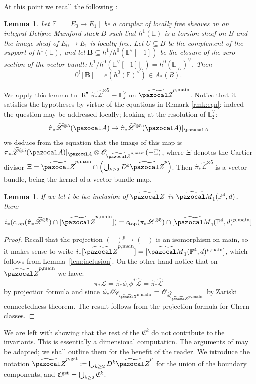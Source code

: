 \documentclass[11pt]{amsart}
\newcommand{\PP}{\mathbb P}
\newcommand{\OO}{\mathcal O}
\renewcommand{\to}{\rightarrow}
\newcommand{\A}{\pazocal A}
\newcommand{\hL}{\widehat{\mathcal L}}
\newcommand{\cC}{\mathcal C}
\newcommand{\hC}{\widehat{\mathcal C}}
\newcommand{\tZ}{\widetilde{\pazocal Z}}
\newcommand{\tZp}{\widetilde{\pazocal Z}^p}
\newcommand{\tM}{\widetilde{\pazocal M}}
\newcommand{\R}{\operatorname{R}}
\theoremstyle{plain}
\newtheorem{lem}[thm]{Lemma}
\theoremstyle{definition}
\begin{document}
At this point we recall the following \cite[Lemma 5.3]{CLpfields}:
\begin{lem}
Let $\mathbb E=[E_0\to E_1]$ be a complex of locally free sheaves on an integral Deligne-Mumford stack $B$ such that
$h^1(\mathbb E)$ is a torsion sheaf on $B$ and the image sheaf of $E_0\to E_1$ is locally free.
Let $U\subseteq B$ be the complement of the support of $h^1(\mathbb E)$, and let $\mathbf{B}\subseteq h^1/h^0(\mathbb E^\vee[-1])$
be the closure of the zero section  of the vector bundle $h^1/h^0(\mathbb E^\vee[-1]|_U)= h^0(\mathbb E|_U)^\vee$. Then
$$0^![\mathbf{B}]=e(h^0(\mathbb E)^\vee)\in A_*(B).
$$
\end{lem}

We apply this lemma to $\R^{\bullet}\hat{\pi}_*\hL^{\otimes 5}=\mathbb E_2^\vee$ on $\tZ^{p,\rm{main}}$. Notice that it satisfies the hypotheses by virtue of the equations in Remark \ref{rmk:eqn}: indeed the question may be addressed locally; looking at the resolution of $\mathbb E_2^\vee$:
\[
 \hat\pi_*\hL^{\otimes 5}(\A)\to \hat\pi_*\hL^{\otimes 5}(\A)\rvert_{\A}
\]
we deduce from the equation that the image of this map is $\pi_*\hL^{\otimes 5}(\A)\rvert_{\A}\otimes\OO_{\tZ^{p,\rm{main}}}(-\Xi)$, where $\Xi$ denotes the Cartier divisor $\Xi=\tZ^{p,\rm{main}}\cap\left(\bigcup_{k\geq 2}D^k\tZp\right)$. Then $\hat\pi_*\hL^{\otimes 5}$ is a vector bundle, being the kernel of a vector bundle map.

\begin{lem}\label{lem:main-compo}
 If we let $i$ be the inclusion of $\tZ$ in $\tM_1(\PP^4,d)$, then:
 \[
  i_*(c_{\rm{top}}(\hat{\pi}_*\hL^{\otimes 5})\cap[\tZ^{p,\rm{main}}])=c_{\rm{top}}({\pi}_*\mathcal L^{\otimes 5})\cap[\tM_1(\PP^4,d)^{p,\rm{main}}]
 \]
\end{lem}
\begin{proof}
 Recall that the projection $(-)^p\to (-)$ is an isomorphism on main, so it makes sense to write $i_*[\tZ^{p,\rm{main}}]=[\tM_1(\PP^4,d)^{p,\rm{main}}]$, which follows from Lemma~\ref{lem:inclusion}. On the other hand notice that on $\tZ^{p,\rm{main}}$ we have:
 \[
  \pi_*\mathcal L=\hat{\pi}_*\phi_*\phi^*\hL=\hat{\pi}_*\hL
 \]
by projection formula and since $\phi_*\OO_{\cC_{\tZ^{p,\rm{main}}}}=\OO_{\hC_{\tZ^{p,\rm{main}}}}$ by Zariski connectedness theorem. The result follows from the projection formula for Chern classes.
\end{proof}

We are left with showing that the rest of the $\mathfrak C^k$ do not contribute to the invariants. This is essentially a dimensional computation. The arguments of \cite[\S\S6-8]{CLpfields} may be adapted; we shall outline them for the benefit of the reader. We introduce the notation $\tZ^{p,\rm{gst}}:=\bigcup_{k\geq 2} D^k\tZp$ for the union of the boundary components, and $\mathfrak C^{\rm{gst}}=\bigcup_{k\geq 2}\mathfrak C^k$.
\end{document}

